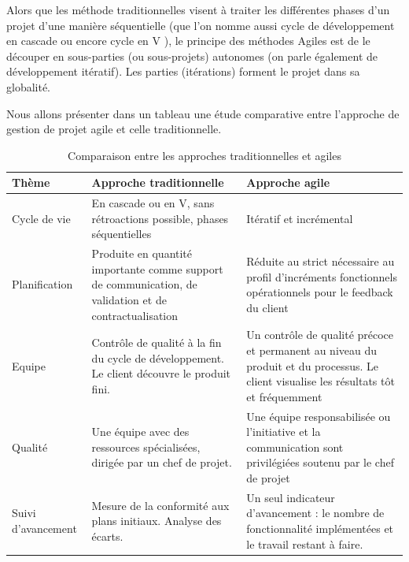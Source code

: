 Alors que les méthode traditionnelles visent à traiter les différentes phases d’un projet d’une
manière séquentielle (que l’on nomme aussi cycle de développement en cascade ou encore cycle
en V ), le principe des méthodes Agiles est de le découper en sous-parties (ou sous-projets)
autonomes (on parle également de développement itératif). Les parties (itérations) forment le
projet dans sa globalité.

Nous allons présenter dans un tableau une étude comparative entre l’approche de gestion
de projet agile et celle traditionnelle.


\begin{table}[H]
	\centering
	\caption{Comparaison entre les approches traditionnelles et agiles}
	\label{tab:my-table}
	\begin{tabular}{|l|p{5cm}|p{6cm}|}
		\hline
		\textbf{Thème}      & \textbf{Approche traditionnelle}                                                                       & \textbf{Approche agile}                                                                                                                                              \\ \hline
		Cycle de vie        & En cascade ou en V, sans rétroactions possible, phases séquentielles                                   & Itératif et incrémental                                                                                                                                              \\ \hline
		Planification       & Produite en quantité importante comme support de communication, de validation et de contractualisation & Réduite au strict nécessaire au profil d’incréments fonctionnels opérationnels pour le feedback du client                                                            \\ \hline
		Equipe              & Contrôle de qualité à la fin du cycle de développement. Le client découvre le produit fini.            & Un contrôle de qualité précoce et permanent au niveau du produit et du processus. Le client visualise les résultats tôt et fréquemment                               \\ \hline
		Qualité             & Une équipe avec des ressources spécialisées, dirigée par un chef de projet.                            & Une équipe responsabilisée ou l’initiative et la communication sont privilégiées soutenu par le chef de projet                                                       \\ \hline
		Suivi d’avancement  & Mesure de la conformité aux plans initiaux. Analyse des écarts.                                        & Un seul indicateur d’avancement : le nombre de fonctionnalité implémentées et le travail restant à faire.                                                            \\ \hline

\end{tabular}
\end{table}

